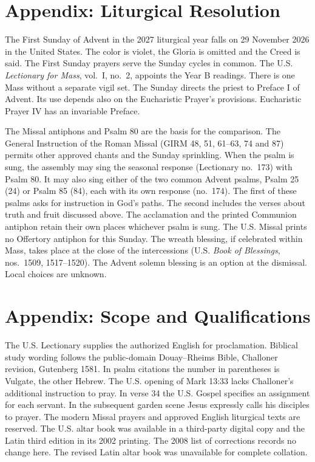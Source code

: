 \section{Appendix: Liturgical Resolution}

The First Sunday of Advent in the 2027 liturgical year falls on 29 November 2026 in the United States. The color is violet, the Gloria is omitted and the Creed is said. The First Sunday prayers serve the Sunday cycles in common. The U.S. \textit{Lectionary for Mass}, vol.~I, no.~2, appoints the Year B readings. There is one Mass without a separate vigil set. The Sunday directs the priest to Preface I of Advent. Its use depends also on the Eucharistic Prayer's provisions. Eucharistic Prayer IV has an invariable Preface.

The Missal antiphons and Psalm 80 are the basis for the comparison. The General Instruction of the Roman Missal (GIRM 48, 51, 61--63, 74 and 87) permits other approved chants and the Sunday sprinkling. When the psalm is sung, the assembly may sing the seasonal response (Lectionary no.~173) with Psalm 80. It may also sing either of the two common Advent psalms, Psalm 25 (24) or Psalm 85 (84), each with its own response (no.~174). The first of these psalms asks for instruction in God's paths. The second includes the verses about truth and fruit discussed above. The acclamation and the printed Communion antiphon retain their own places whichever psalm is sung. The U.S. Missal prints no Offertory antiphon for this Sunday. The wreath blessing, if celebrated within Mass, takes place at the close of the intercessions (U.S. \textit{Book of Blessings}, nos.~1509, 1517--1520). The Advent solemn blessing is an option at the dismissal. Local choices are unknown.

\section{Appendix: Scope and Qualifications}

The U.S. Lectionary supplies the authorized English for proclamation. Biblical study wording follows the public-domain Douay--Rheims Bible, Challoner revision, Gutenberg 1581. In psalm citations the number in parentheses is Vulgate, the other Hebrew. The U.S. opening of Mark 13:33 lacks Challoner's additional instruction to pray. In verse 34 the U.S. Gospel specifies an assignment for each servant. In the subsequent garden scene Jesus expressly calls his disciples to prayer. The modern Missal prayers and approved English liturgical texts are reserved. The U.S. altar book was available in a third-party digital copy and the Latin third edition in its 2002 printing. The 2008 list of corrections records no change here. The revised Latin altar book was unavailable for complete collation.

